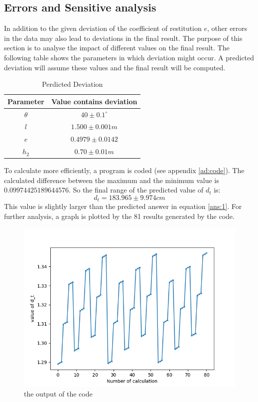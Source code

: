 \documentclass{article}
\begin{document}
    \subsection{Errors and Sensitive analysis}
    In addition to the given deviation of the coefficient of restitution $e$, other errors in the data may also lead to deviations in the final result. The purpose of this section is to analyse the impact of different values on the final result. The following table shows the parameters in which deviation might occur. A predicted deviation will assume these values and the final result will be computed.
    \begin{table}[H]
                \caption {Perdicted Deviation} \label{tb:deviation} 
                \begin{center}
                    \begin{tabular}{cc}
                        \hline
                        Parameter & Value contains deviation \\
                        \hline
                        $\theta$     & $40\pm0.1^ \circ$     \\
                        $l$         & $1.500\pm 0.001m$     \\
                        $e$         & $0.4979 \pm 0.0142$     \\
                        $h_2$        & $0.70\pm0.01m$     \\
                        \hline
                    \end{tabular}
                \end{center}
            \end{table}
    To calculate more efficiently, a program is coded (see appendix \ref{ad:code}).
    The calculated difference between the maximum and the minimum value is $0.09974425189644576$. So the final range of the predicted value of $d_t$ is:
    $$d_t = 183.965\pm9.974cm$$
    This value is slightly larger than the predicted answer in equation \ref{ans:1}. For further analysis, a graph is plotted by the 81 results generated by the code. 
    \begin{figure}[H]
        \centering
        \includegraphics[width=0.75\linewidth]{code_output.png}
        \caption{the output of the code}
        \label{fig:code_output}
    \end{figure}
\end{document}
